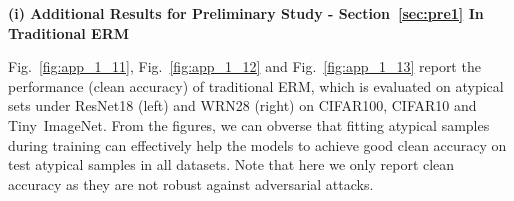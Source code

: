\textbf{(i) Additional Results for Preliminary Study - Section~\ref{sec:pre1} In Traditional ERM}

Fig.~\ref{fig:app_1_11}, Fig.~\ref{fig:app_1_12} and Fig.~\ref{fig:app_1_13} report the performance (clean accuracy) of traditional ERM, which is evaluated on atypical sets under ResNet18 (left) and WRN28 (right) on CIFAR100, CIFAR10 and Tiny~ImageNet. From the figures, we can obverse that fitting atypical samples during training can effectively help the models to achieve good clean accuracy on test atypical samples in all datasets. Note that here we only report clean accuracy as they are not robust against adversarial attacks.

\begin{figure}[h]
\centering
\hspace*{-1cm}
\hspace*{0.4cm}
\end{figure}
